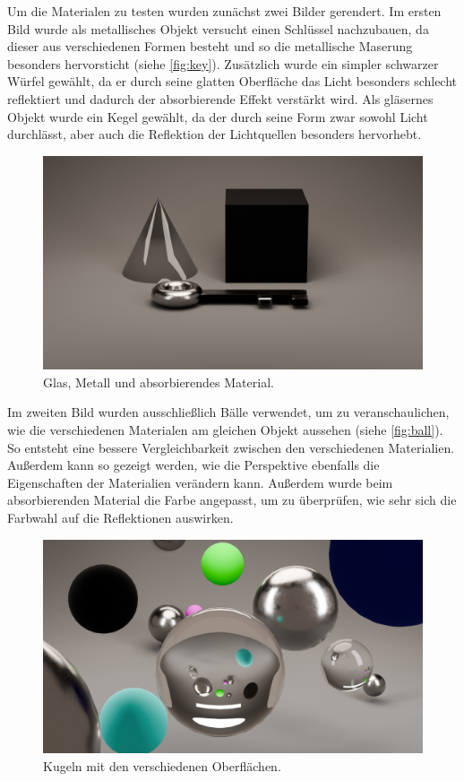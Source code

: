 \documentclass[a4paper]{article}
\begin{document}
Um die Materialen zu testen wurden zunächst zwei Bilder gerendert. Im ersten Bild wurde als metallisches Objekt versucht einen Schlüssel nachzubauen, da dieser aus verschiedenen Formen besteht und so die metallische Maserung besonders hervorsticht (siehe \autoref{fig:key}). Zusätzlich wurde ein simpler schwarzer Würfel gewählt, da er durch seine glatten Oberfläche das Licht besonders schlecht reflektiert und dadurch der absorbierende Effekt verstärkt wird. Als gläsernes Objekt wurde ein Kegel gewählt, da der durch seine Form zwar sowohl Licht durchlässt, aber auch die Reflektion der Lichtquellen besonders hervorhebt.

\begin{figure}
	\centering
	\includegraphics[width=0.5\linewidth]{img/Key.jpg}
	\caption{Glas, Metall und absorbierendes Material.}
	\label{fig:key}
\end{figure}


Im zweiten Bild wurden ausschließlich Bälle verwendet, um zu veranschaulichen, wie die verschiedenen Materialen am gleichen Objekt aussehen (siehe \autoref{fig:ball}). So entsteht eine bessere Vergleichbarkeit zwischen den verschiedenen Materialien. Außerdem kann so gezeigt werden, wie die Perspektive ebenfalls die Eigenschaften der Materialien verändern kann. Außerdem wurde beim absorbierenden Material die Farbe angepasst, um zu überprüfen, wie sehr sich die Farbwahl auf die Reflektionen auswirken.

\begin{figure}[h]
	\centering
	\includegraphics[width=0.5\linewidth]{img/Baelle.png}
	\caption{Kugeln mit den verschiedenen Oberflächen.}
	\label{fig:ball}
\end{figure}
\end{document}
